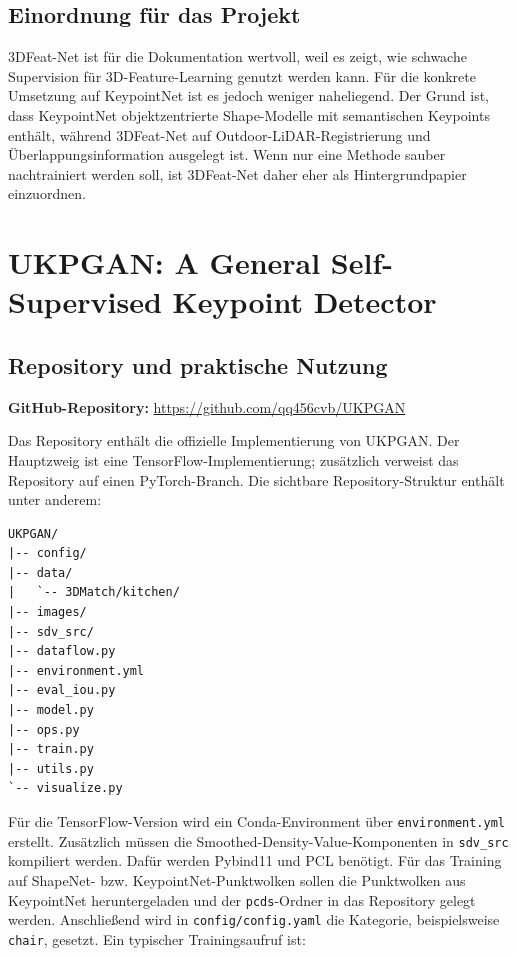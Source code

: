 \documentclass[11pt,a4paper]{article}
\begin{document}
\subsection{Einordnung für das Projekt}

3DFeat-Net ist für die Dokumentation wertvoll, weil es zeigt, wie schwache Supervision für 3D-Feature-Learning genutzt werden kann. Für die konkrete Umsetzung auf KeypointNet ist es jedoch weniger naheliegend. Der Grund ist, dass KeypointNet objektzentrierte Shape-Modelle mit semantischen Keypoints enthält, während 3DFeat-Net auf Outdoor-LiDAR-Registrierung und Überlappungsinformation ausgelegt ist. Wenn nur eine Methode sauber nachtrainiert werden soll, ist 3DFeat-Net daher eher als Hintergrundpapier einzuordnen.

\section{UKPGAN: A General Self-Supervised Keypoint Detector}

\subsection{Repository und praktische Nutzung}

\textbf{GitHub-Repository:} \url{https://github.com/qq456cvb/UKPGAN}

Das Repository enthält die offizielle Implementierung von UKPGAN. Der Hauptzweig ist eine TensorFlow-Implementierung; zusätzlich verweist das Repository auf einen PyTorch-Branch. Die sichtbare Repository-Struktur enthält unter anderem:

\begin{lstlisting}
UKPGAN/
|-- config/
|-- data/
|   `-- 3DMatch/kitchen/
|-- images/
|-- sdv_src/
|-- dataflow.py
|-- environment.yml
|-- eval_iou.py
|-- model.py
|-- ops.py
|-- train.py
|-- utils.py
`-- visualize.py
\end{lstlisting}

Für die TensorFlow-Version wird ein Conda-Environment über \texttt{environment.yml} erstellt. Zusätzlich müssen die Smoothed-Density-Value-Komponenten in \texttt{sdv\_src} kompiliert werden. Dafür werden Pybind11 und PCL benötigt. Für das Training auf ShapeNet- bzw. KeypointNet-Punktwolken sollen die Punktwolken aus KeypointNet heruntergeladen und der \texttt{pcds}-Ordner in das Repository gelegt werden. Anschließend wird in \texttt{config/config.yaml} die Kategorie, beispielsweise \texttt{chair}, gesetzt. Ein typischer Trainingsaufruf ist:
\end{document}
